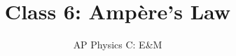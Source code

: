 \documentclass[12pt,aspectratio=169]{beamer}
\title{Class 6: Amp\`{e}re's Law}
\subtitle{AP Physics C: E\&M}
\begin{document}
\begin{frame}
  \maketitle
\end{frame}


%
%
%
%
%
%
%
%
%
%
%
%
\end{document}
